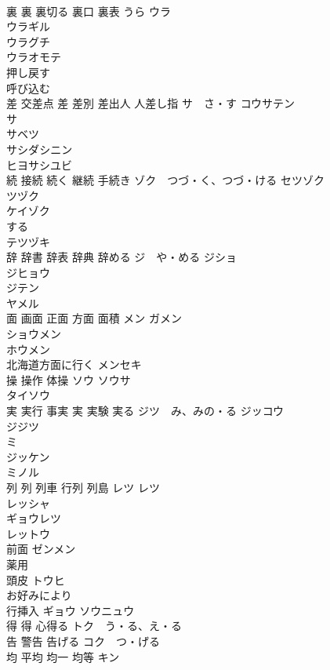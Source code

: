 \documentclass[8pt]{extreport}
\begin{document}
\begin{CJK}{UTF8}{min}
\\	裏 裏 裏切る 裏口 裏表	うら ウラ 
\\	ウラギル 
\\	ウラグチ 
\\	ウラオモテ 
\\	押し戻す	
\\	呼び込む	
\\	差 交差点 差 差別 差出人 人差し指	サ　さ・す コウサテン 
\\	サ 
\\	サベツ 
\\	サシダシニン 
\\	ヒヨサシユビ 
\\	続 接続 続く 継続 手続き	ゾク　つづ・く、つづ・ける セツゾク 
\\	ツヅク 
\\	ケイゾク 
\\	する 
\\	テツヅキ 
\\	辞 辞書 辞表 辞典 辞める	ジ　や・める ジショ 
\\	ジヒョウ 
\\	ジテン 
\\	ヤメル　
\\	面 画面 正面 方面 面積	メン ガメン 
\\	ショウメン 
\\	ホウメン 
\\	北海道方面に行く メンセキ 
\\	操 操作 体操	ソウ ソウサ 
\\	タイソウ 
\\	実 実行 事実 実 実験 実る	ジツ　み、みの・る ジッコウ 
\\	ジジツ 
\\	ミ 
\\	ジッケン 
\\	ミノル 
\\	列 列 列車 行列 列島	レツ レツ 
\\	レッシャ 
\\	ギョウレツ 
\\	レットウ 
\\	前面	ゼンメン 
\\	薬用	
\\	頭皮	トウヒ 
\\	お好みにより	
\\	行挿入	ギョウ ソウニュウ 
\\	得 得 心得る	トク　う・る、え・る 
\\	告 警告 告げる	コク　つ・げる 
\\	均 平均 均一 均等	キン 

\end{CJK}
\end{document}
